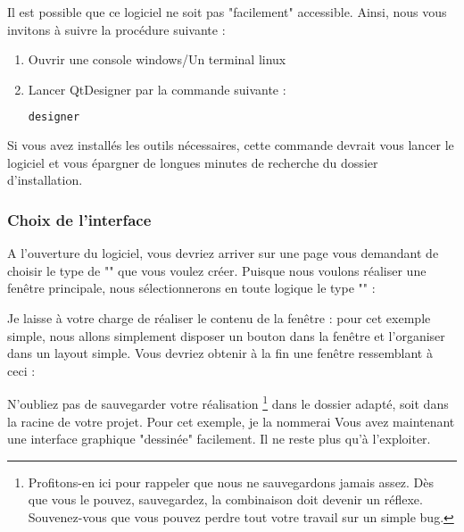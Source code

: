 Il est possible que ce logiciel ne soit pas "facilement" accessible. Ainsi, nous vous invitons à suivre la procédure suivante :
\begin{enumerate}
\item Ouvrir une console windows/Un terminal linux
\item Lancer QtDesigner par la commande suivante :
\begin{lstlisting}[language=bash]
designer
\end{lstlisting}
\end{enumerate}

Si vous avez installés les outils nécessaires, cette commande devrait vous lancer le logiciel et vous épargner de longues minutes de recherche du dossier d'installation.

\subsubsection{Choix de l'interface}

A l'ouverture du logiciel, vous devriez arriver sur une page vous demandant de choisir le type de "" que vous voulez créer.\newline
Puisque nous voulons réaliser une fenêtre principale, nous sélectionnerons en toute logique le type "\eType{\textcolor{red}{MainWindow}}" :


Je laisse à votre charge de réaliser le contenu de la fenêtre : pour cet exemple simple, nous allons simplement disposer un bouton dans la fenêtre et l'organiser dans un layout simple.\newline
Vous devriez obtenir à la fin une fenêtre ressemblant à ceci :


N'oubliez pas de sauvegarder votre réalisation
\footnote{
Profitons-en ici pour rappeler que nous ne sauvegardons jamais assez. Dès que vous le pouvez, sauvegardez, la combinaison \bold{\textcolor{red}{Ctrl+S}} doit devenir un réflexe. Souvenez-vous que vous pouvez perdre tout votre travail sur un simple bug.
}
dans le dossier adapté, soit  dans la racine de votre projet. Pour cet exemple, je la nommerai \newline
Vous avez maintenant une interface graphique "dessinée" facilement. Il ne reste plus qu'à l'exploiter.


